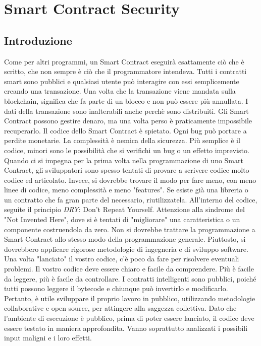 \chapter{Smart Contract Security}

\section{Introduzione}

Come per altri programmi, un Smart Contract eseguirà esattamente ciò che è scritto,
che non sempre è ciò che il programmatore intendeva. Tutti i contratti smart sono
pubblici e qualsiasi utente può interagire con essi semplicemente creando una
transazione.
Una volta che la transazione viene mandata sulla blockchain, significa che fa parte
di un blocco e non può essere più annullata.
I dati della transazione sono inalterabili anche perchè
sono distribuiti.
Gli Smart Contract possono gestire denaro, ma una volta perso è praticamente
impossibile recuperarlo.
Il codice dello Smart Contract è spietato. Ogni bug può portare a perdite
monetarie.
La complessità è nemica della sicurezza. Più semplice è il codice,
minori sono le possibilità
che si verifichi un bug o un effetto imprevisto. Quando ci si impegna per la
prima volta nella
programmazione di uno Smart Contract, gli sviluppatori sono spesso tentati di
provare a scrivere codice molto codice ed articolato.
Invece, si dovrebbe trovare il modo per fare meno, con meno linee di
codice, meno complessità e meno "features".
Se esiste già una libreria o un contratto che fa gran parte del necessario,
riutilizzatela.
All'interno del codice, seguite il principio \textit{DRY}: Don't Repeat Yourself.
Attenzione alla sindrome del "Not Invented Here", dove si è tentati di
"migliorare" una caratteristica o un componente costruendola da zero.
Non si dovrebbe trattare la programmazione a Smart Contract allo stesso modo della
programmazione generale. Piuttosto, si dovrebbero applicare rigorose metodologie di
ingegneria e di sviluppo software.
Una volta "lanciato" il vostro codice, c'è poco da fare per risolvere eventuali
problemi.
Il vostro codice deve essere chiaro e facile da comprendere.
Più è facile da leggere, più è
facile da controllare.
I contratti intelligenti sono pubblici, poiché tutti possono leggere il bytecode
e chiunque può
invertirlo e modificarlo. Pertanto, è utile sviluppare il proprio lavoro in
pubblico, utilizzando
metodologie collaborative e open source, per attingere alla saggezza collettiva.
Dato che l'ambiente di esecuzione è pubblico, prima di poter essere lanciato,
il codice deve essere
testato in maniera approfondita.
Vanno soprattutto analizzati i possibili input maligni e i loro effetti.

